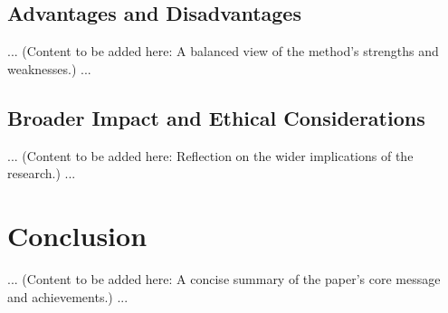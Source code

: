\documentclass{article}
\begin{document}
\subsection{Advantages and Disadvantages}
... (Content to be added here: A balanced view of the method's strengths and weaknesses.) ...

\subsection{Broader Impact and Ethical Considerations}
... (Content to be added here: Reflection on the wider implications of the research.) ...

\section{Conclusion}
... (Content to be added here: A concise summary of the paper's core message and achievements.) ...






\end{document}
